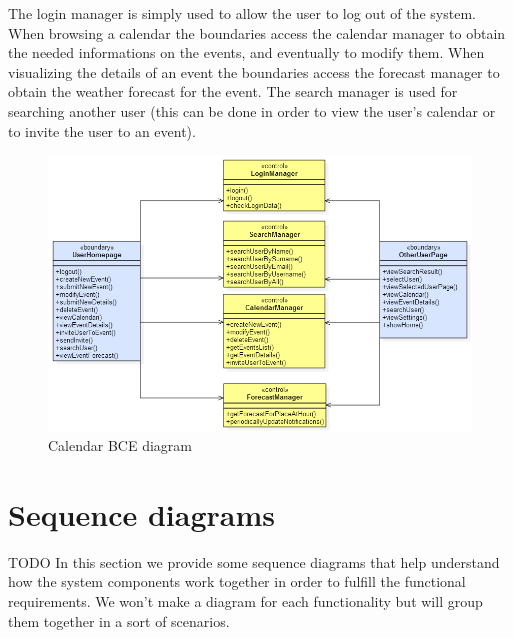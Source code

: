 \documentclass[10pt,a4paper,titlepage]{article}
\begin{document}
The login manager is simply used to allow the user to log out of the system.
When browsing a calendar the boundaries access the calendar manager to obtain the needed informations on the events, and eventually to modify them.
When visualizing the details of an event the boundaries access the forecast manager to obtain the weather forecast for the event.
The search manager is used for searching another user (this can be done in order to view the user's calendar or to invite the user to an event).
\begin{figure}[h]
\centering
\includegraphics[width=\linewidth]{./bce/calendar_bce}
\caption[calendar bce]{Calendar BCE diagram}
\label{fig:calendar_bce}
\end{figure}

\section{Sequence diagrams}
TODO
In this section we provide some sequence diagrams that help understand how the system components work together in order to fulfill the functional requirements. We won't make a diagram for each functionality but will group them together in a sort of scenarios.
\end{document}
